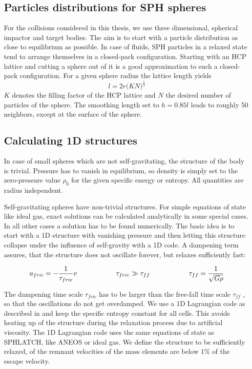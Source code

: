 \subsection{Particles distributions for SPH spheres}
For the collisions considered in this thesis, we use three dimensional, spherical impactor and target bodies. The aim is to start with a particle distribution as close to equilibrium as possible. In case of fluids, SPH particles in a relaxed state tend to arrange themselves in a closed-pack configuration. Starting with an HCP lattice and cutting a sphere out of it is a good approximation to such a closed-pack configuration. For a given sphere radius the lattice length yields
\begin{equation}
\label{ch02_aux_eq001}
l = 2 r \big( K N \big)^{\frac{1}{3}}
\end{equation}
$K$ denotes the filling factor of the HCP lattice and $N$ the desired number of particles of the sphere. The smoothing length set to $h = 0.85 l$ leads to roughly 50 neighbors, except at the surface of the sphere.

\subsection{Calculating 1D structures}
\label{ch02_sec1dstruc}
In case of small spheres which are not self-gravitating, the structure of the body is trivial. Pressure has to vanish in equilibrium, so density is simply set to the zero-pressure value $\rho_0$ for the given specific energy or entropy. All quantities are radius independent.

Self-gravitating spheres have non-trivial structures. For simple equations of state like ideal gas, exact solutions can be calculated analytically in some special cases. In all other cases a solution has to be found numerically. The basic idea is to start with a 1D structure with vanishing pressure and then letting this structure collapse under the influence of self-gravity with a 1D code. A dampening term assures, that the structure does not oscillate forever, but relaxes sufficiently fast:

\begin{equation}
\label{ch02_aux_eq002}
a_{fric} = - \frac{1}{\tau_{fric}} v \hspace{2.0cm} \tau_{fric} \gg \tau_{ff}\hspace{2.0cm} \tau_{ff} = \frac{1}{\sqrt{G \rho} }
\end{equation}

The dampening time scale $\tau_{fric}$ has to be larger than the free-fall time scale $\tau_{ff}$ \citep{shore2007astrophysical}, so that the oscillations do not get overdamped. We use a 1D Lagrangian code as described in \citep{Benz:1991p700} and keep the specific entropy constant for all cells. This avoids heating up of the structure during the relaxation process due to artificial viscosity. The 1D Lagrangian code uses the same equations of state as SPHLATCH, like ANEOS or ideal gas. We define the structure to be sufficiently relaxed, of the remnant velocities of the mass elements are below $1\%$ of the escape velocity. 

